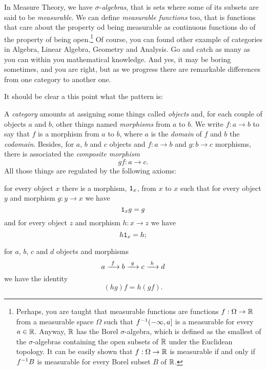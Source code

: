 \begin{exercise}
  In Measure Theory, we have \(\sigma\)-{\em algebras}, that is sets
  where some of its subsets are said to be {\em measurable}. We can
  define {\em measurable functions} too, that is functions that care
  about the property od being measurable as continuous functions do of
  the property of being open.\footnote{Perhaps, you are taught that
    measurable functions are functions \(f : \Omega \to \mathbb R\) from
    a measurable space \(\Omega\) such that \(f^{-1} (-\infty, a]\) is
    a measurable for every \(a \in \mathbb R\). Anyway, \(\mathbb R\) has
    the Borel \(\sigma\)-algebra, which is defined as the smallest of
    the \(\sigma\)-algebras containing the open subsets of \(\mathbb R\)
    under the Euclidean topology. It can be easily shown that
    \(f : \Omega \to \mathbb R\) is measurable if and only if
    \(f^{-1} B\) is measurable for every Borel subset \(B\) of
    \(\mathbb R\).} Of course, you can found other example of categories
  in Algebra, Linear Algebra, Geometry and Analysis. Go and catch as
  many as you can within you mathematical knowledge. And yes, it may
  be boring sometimes, and you are right, but as we progress there are
  remarkable differences from one category to another one.
\end{exercise}

It should be clear a this point what the pattern is:

\begin{definition}[Categories]
  A {\em category} amounts at assigning some things called {\em
    objects} and, for each couple of objects \(a\) and \(b\), other
  things named {\em morphisms} from \(a\) to \(b\). We write
  \(f : a \to b\) to say that \(f\) is a morphism from \(a\) to \(b\),
  where \(a\) is the {\em domain} of \(f\) and \(b\) the {\em
    codomain}. Besides, for \(a\), \(b\) and \(c\) objects and
  \(f : a \to b\) and \(g : b \to c\) morphisms, there is associated
  the {\em composite morphism}
  \[gf : a \to c .\] All those things are regulated by the following
  axioms:
  \begin{tcbenum}
  \item for every object \(x\) there is a morphism, \(\mathtt 1_x\), from
    \(x\) to \(x\) such that for every object \(y\) and morphism
    \(g : y \to x\) we have
    \[\mathtt 1_x g = g\]
    and for every object \(z\) and morphism \(h : x \to z\) we have
    \[h \mathtt 1_x = h ;\]
  \item for \(a\), \(b\), \(c\) and \(d\) objects and morphisms
    \[a \xrightarrow{\ f\ } b \xrightarrow{\ g\ } c \xrightarrow{\ h\ } d\] we have the identity
    \[(h g) f = h (g f) .\]
  \end{tcbenum}
\end{definition}

